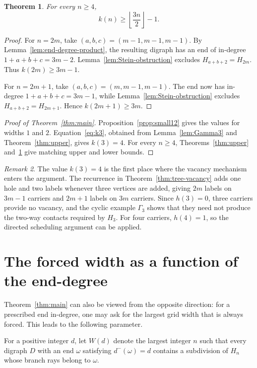 \documentclass[11pt]{article}
\newtheorem{theorem}{Theorem}[section]
\theoremstyle{remark}
\newtheorem{remark}[theorem]{Remark}
\numberwithin{equation}{section}
\begin{document}
\begin{theorem}\label{thm:lower}
For every $n\ge4$,
\[
k(n)\ge\left\lfloor\frac{3n}{2}\right\rfloor-1.
\]
\end{theorem}

\begin{proof}
For $n=2m$, take $(a,b,c)=(m-1,m-1,m-1)$. By Lemma~\ref{lem:end-degree-product}, the resulting digraph
has an end of in-degree $1+a+b+c=3m-2$. Lemma~\ref{lem:Stein-obstruction} excludes $H_{a+b+2}=H_{2m}$. Thus
$k(2m)\ge3m-1$.

For $n=2m+1$, take $(a,b,c)=(m,m-1,m-1)$. The end now has in-degree $1+a+b+c=3m-1$, while Lemma~\ref{lem:Stein-obstruction} excludes $H_{a+b+2}=H_{2m+1}$. Hence $k(2m+1)\ge3m$.
\end{proof}

\begin{proof}[Proof of Theorem~\ref{thm:main}]
Proposition~\ref{prop:small12} gives the values for widths $1$ and $2$. Equation~\eqref{eq:k3}, obtained from Lemma~\ref{lem:Gamma3} and Theorem~\ref{thm:upper}, gives $k(3)=4$. For every $n\ge4$, Theorems~\ref{thm:upper} and~\ref{thm:lower} give matching upper and lower bounds.
\end{proof}

\begin{remark}
The value $k(3)=4$ is the first place where the vacancy mechanism enters the argument. The recurrence in Theorem~\ref{thm:tree-vacancy} adds one hole and two labels whenever three vertices are added, giving $2m$ labels on $3m-1$ carriers and $2m+1$ labels on $3m$ carriers. Since $h(3)=0$, three carriers provide no vacancy, and the cyclic example $\Gamma_3$ shows that they need not produce the two-way contacts required by $H_3$. For four carriers, $h(4)=1$, so the directed scheduling argument can be applied.
\end{remark}

\section{The forced width as a function of the end-degree}
Theorem~\ref{thm:main} can also be viewed from the opposite direction: for a prescribed end in-degree, one may ask for the largest grid width that is always forced. This leads to the following parameter.

For a positive integer $d$, let $W(d)$ denote the largest integer $n$ such that every digraph $D$ with an end $\omega$ satisfying $d^-(\omega)=d$ contains a subdivision of $H_n$ whose branch rays belong to $\omega$.
\end{document}
